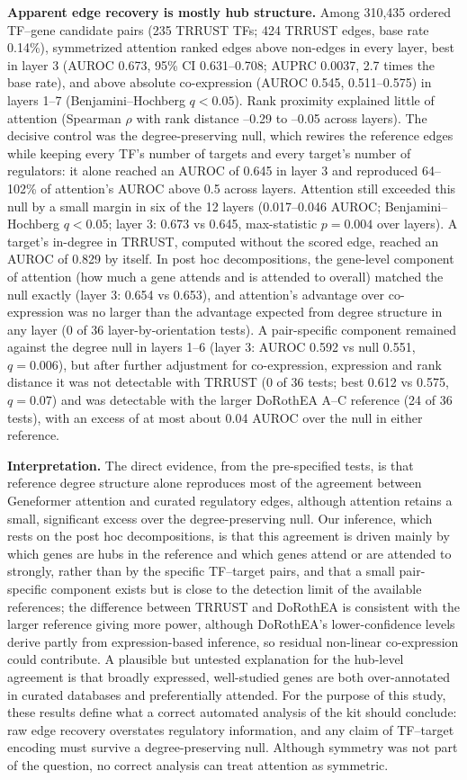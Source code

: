 \documentclass[10pt,letterpaper]{article}
\begin{document}
\textbf{Apparent edge recovery is mostly hub structure.} Among 310,435 ordered TF--gene candidate pairs (235 TRRUST TFs; 424 TRRUST edges, base rate 0.14\%), symmetrized attention ranked edges above non-edges in every layer, best in layer 3 (AUROC 0.673, 95\% CI 0.631--0.708; AUPRC 0.0037, 2.7 times the base rate), and above absolute co-expression (AUROC 0.545, 0.511--0.575) in layers 1--7 (Benjamini--Hochberg $q<0.05$). Rank proximity explained little of attention (Spearman $\rho$ with rank distance --0.29 to --0.05 across layers). The decisive control was the degree-preserving null, which rewires the reference edges while keeping every TF's number of targets and every target's number of regulators: it alone reached an AUROC of 0.645 in layer 3 and reproduced 64--102\% of attention's AUROC above 0.5 across layers. Attention still exceeded this null by a small margin in six of the 12 layers (0.017--0.046 AUROC; Benjamini--Hochberg $q<0.05$; layer 3: 0.673 vs 0.645, max-statistic $p=0.004$ over layers). A target's in-degree in TRRUST, computed without the scored edge, reached an AUROC of 0.829 by itself. In post hoc decompositions, the gene-level component of attention (how much a gene attends and is attended to overall) matched the null exactly (layer 3: 0.654 vs 0.653), and attention's advantage over co-expression was no larger than the advantage expected from degree structure in any layer (0 of 36 layer-by-orientation tests). A pair-specific component remained against the degree null in layers 1--6 (layer 3: AUROC 0.592 vs null 0.551, $q=0.006$), but after further adjustment for co-expression, expression and rank distance it was not detectable with TRRUST (0 of 36 tests; best 0.612 vs 0.575, $q=0.07$) and was detectable with the larger DoRothEA A--C reference (24 of 36 tests), with an excess of at most about 0.04 AUROC over the null in either reference.

\textbf{Interpretation.} The direct evidence, from the pre-specified tests, is that reference degree structure alone reproduces most of the agreement between Geneformer attention and curated regulatory edges, although attention retains a small, significant excess over the degree-preserving null. Our inference, which rests on the post hoc decompositions, is that this agreement is driven mainly by which genes are hubs in the reference and which genes attend or are attended to strongly, rather than by the specific TF--target pairs, and that a small pair-specific component exists but is close to the detection limit of the available references; the difference between TRRUST and DoRothEA is consistent with the larger reference giving more power, although DoRothEA's lower-confidence levels derive partly from expression-based inference, so residual non-linear co-expression could contribute. A plausible but untested explanation for the hub-level agreement is that broadly expressed, well-studied genes are both over-annotated in curated databases and preferentially attended. For the purpose of this study, these results define what a correct automated analysis of the kit should conclude: raw edge recovery overstates regulatory information, and any claim of TF--target encoding must survive a degree-preserving null. Although symmetry was not part of the question, no correct analysis can treat attention as symmetric.
\end{document}
